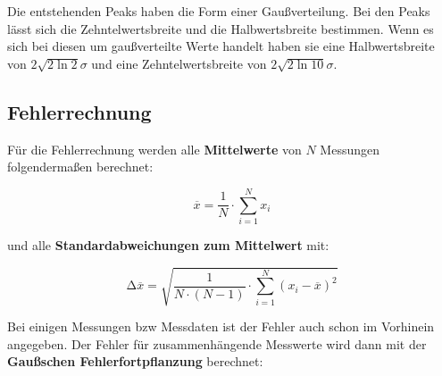 Die entstehenden Peaks haben die Form einer Gaußverteilung. Bei den Peaks lässt
sich die Zehntelwertsbreite und die Halbwertsbreite bestimmen. Wenn es sich bei
diesen um gaußverteilte Werte handelt haben sie eine Halbwertsbreite von
$2\sqrt{2\ln 2} \sigma$ und eine Zehntelwertsbreite von $2 \sqrt{2\ln
		10}\sigma$.



\subsection{Fehlerrechnung}
Für die Fehlerrechnung werden alle \textbf{Mittelwerte} von $N$ Messungen
folgendermaßen berechnet:

\begin{equation}
	\overline{x} = \frac{1}{N} \cdot \sum_{i=1}^N x_i
	\label{eqn:Mittelwert}
\end{equation}

und alle \textbf{Standardabweichungen zum Mittelwert} mit:

\begin{equation}
	\increment\overline{x} = \sqrt{\frac{1}{N\cdot(N-1)}\cdot\sum_{i=1}^N (x_i-\overline{x})^2}
	\label{eqn:St_Mittelwert}
\end{equation}

Bei einigen Messungen bzw Messdaten ist der Fehler auch schon im Vorhinein
angegeben. Der Fehler für zusammenhängende Messwerte wird dann mit der
\textbf{Gaußschen Fehlerfortpflanzung} berechnet:

